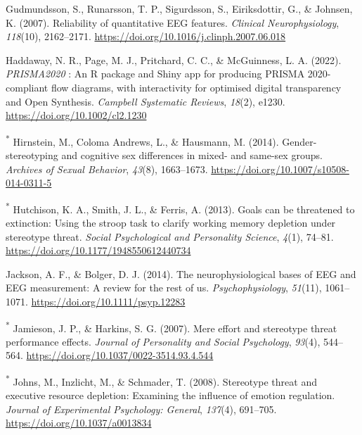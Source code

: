 \documentclass[
  stu, a4paper,floatsintext]{apa7}
\newlength{\cslhangindent}
\newenvironment{CSLReferences}[2] %
 {\begin{list}{}{%
  \setlength{\itemindent}{0pt}
  \setlength{\leftmargin}{0pt}
  \setlength{\parsep}{0pt}
  \ifodd #1
   \setlength{\leftmargin}{\cslhangindent}
   \setlength{\itemindent}{-1\cslhangindent}
  \fi
  \setlength{\itemsep}{#2\baselineskip}}}
 {\end{list}}
\begin{document}
\begin{CSLReferences}{1}{0}
Gudmundsson, S., Runarsson, T. P., Sigurdsson, S., Eiriksdottir, G., \& Johnsen, K. (2007). Reliability of quantitative {EEG} features. \emph{Clinical Neurophysiology}, \emph{118}(10), 2162--2171. \url{https://doi.org/10.1016/j.clinph.2007.06.018}

Haddaway, N. R., Page, M. J., Pritchard, C. C., \& McGuinness, L. A. (2022). {\emph{PRISMA2020}} : {An R} package and {Shiny} app for producing {PRISMA} 2020-compliant flow diagrams, with interactivity for optimised digital transparency and {Open Synthesis}. \emph{Campbell Systematic Reviews}, \emph{18}(2), e1230. \url{https://doi.org/10.1002/cl2.1230}

\textsuperscript{*} Hirnstein, M., Coloma Andrews, L., \& Hausmann, M. (2014). Gender-stereotyping and cognitive sex differences in mixed- and same-sex groups. \emph{Archives of Sexual Behavior}, \emph{43}(8), 1663--1673. \url{https://doi.org/10.1007/s10508-014-0311-5}

\textsuperscript{*} Hutchison, K. A., Smith, J. L., \& Ferris, A. (2013). Goals can be threatened to extinction: {Using} the stroop task to clarify working memory depletion under stereotype threat. \emph{Social Psychological and Personality Science}, \emph{4}(1), 74--81. \url{https://doi.org/10.1177/1948550612440734}

Jackson, A. F., \& Bolger, D. J. (2014). The neurophysiological bases of {\textsc{EEG}} and {\textsc{EEG}} measurement: {A} review for the rest of us. \emph{Psychophysiology}, \emph{51}(11), 1061--1071. \url{https://doi.org/10.1111/psyp.12283}

\textsuperscript{*} Jamieson, J. P., \& Harkins, S. G. (2007). Mere effort and stereotype threat performance effects. \emph{Journal of Personality and Social Psychology}, \emph{93}(4), 544--564. \url{https://doi.org/10.1037/0022-3514.93.4.544}

\textsuperscript{*} Johns, M., Inzlicht, M., \& Schmader, T. (2008). Stereotype threat and executive resource depletion: {Examining} the influence of emotion regulation. \emph{Journal of Experimental Psychology: General}, \emph{137}(4), 691--705. \url{https://doi.org/10.1037/a0013834}


\end{CSLReferences}
\end{document}
